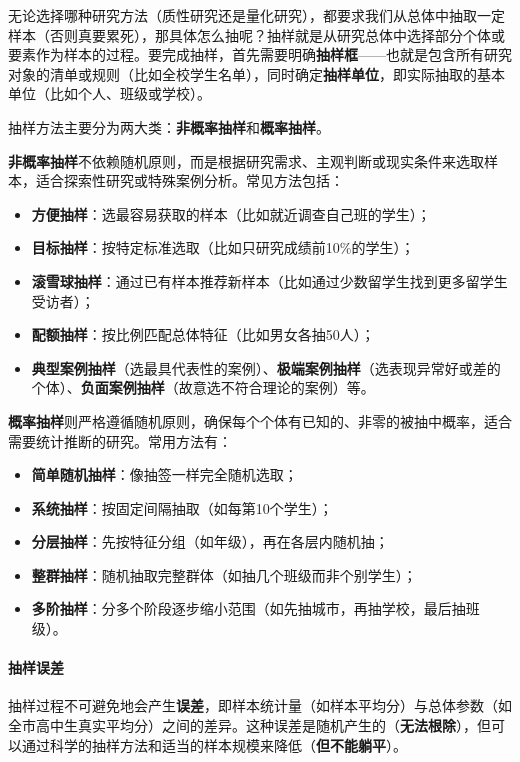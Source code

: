无论选择哪种研究方法（质性研究还是量化研究），都要求我们从总体中抽取一定样本（否则真要累死），那具体怎么抽呢？抽样就是从研究总体中选择部分个体或要素作为样本的过程。要完成抽样，首先需要明确\textbf{抽样框}------也就是包含所有研究对象的清单或规则（比如全校学生名单），同时确定\textbf{抽样单位}，即实际抽取的基本单位（比如个人、班级或学校）。

抽样方法主要分为两大类：\textbf{非概率抽样}和\textbf{概率抽样}。

\textbf{非概率抽样}不依赖随机原则，而是根据研究需求、主观判断或现实条件来选取样本，适合探索性研究或特殊案例分析。常见方法包括：

\begin{itemize}
	\item
	\textbf{方便抽样}：选最容易获取的样本（比如就近调查自己班的学生）；
	\item
	\textbf{目标抽样}：按特定标准选取（比如只研究成绩前10\%的学生）；
	\item
	\textbf{滚雪球抽样}：通过已有样本推荐新样本（比如通过少数留学生找到更多留学生受访者）；
	\item
	\textbf{配额抽样}：按比例匹配总体特征（比如男女各抽50人）；
	\item
	\textbf{典型案例抽样}（选最具代表性的案例）、\textbf{极端案例抽样}（选表现异常好或差的个体）、\textbf{负面案例抽样}（故意选不符合理论的案例）等。
\end{itemize}

\textbf{概率抽样}则严格遵循随机原则，确保每个个体有已知的、非零的被抽中概率，适合需要统计推断的研究。常用方法有：

\begin{itemize}
	\item
	\textbf{简单随机抽样}：像抽签一样完全随机选取；
	\item
	\textbf{系统抽样}：按固定间隔抽取（如每第10个学生）；
	\item
	\textbf{分层抽样}：先按特征分组（如年级），再在各层内随机抽；
	\item
	\textbf{整群抽样}：随机抽取完整群体（如抽几个班级而非个别学生）；
	\item
	\textbf{多阶抽样}：分多个阶段逐步缩小范围（如先抽城市，再抽学校，最后抽班级）。
\end{itemize}

\paragraph*{抽样误差}

抽样过程不可避免地会产生\textbf{误差}，即样本统计量（如样本平均分）与总体参数（如全市高中生真实平均分）之间的差异。这种误差是随机产生的（\textbf{无法根除}），但可以通过科学的抽样方法和适当的样本规模来降低（\textbf{但不能躺平}）。

